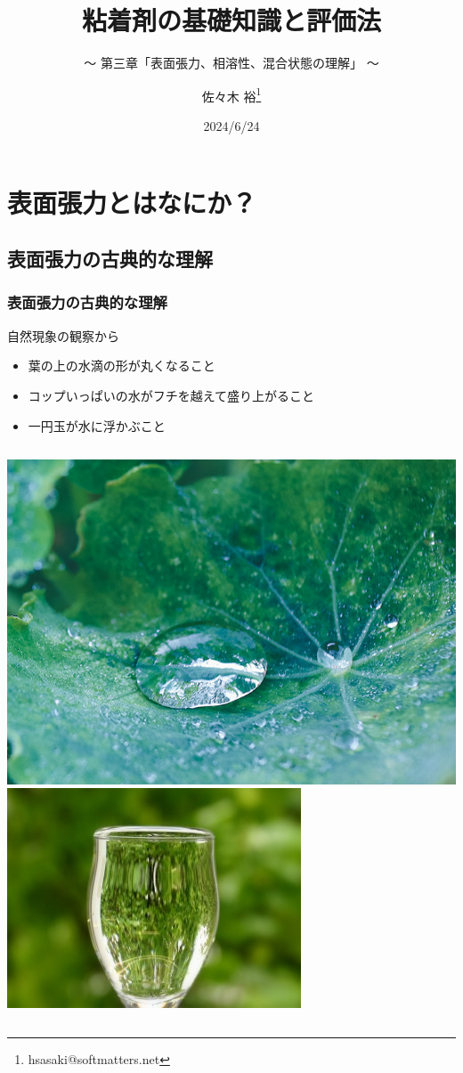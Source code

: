 \documentclass[unicode,12pt]{beamer}%
\title{粘着剤の基礎知識と評価法}
\subtitle{～ 第三章「表面張力、相溶性、混合状態の理解」 ～}
\author[SDL Inc. 佐々木]{佐々木 裕\thanks{hsasaki@softmatters.net}}
\institute[]{元 東亞合成株式会社\\ソフトマターデザインラボ合同会社}
\date{2024/6/24}
\begin{document}
\maketitle

\begin{frame} 
    \tableofcontents[]
\end{frame} 

\section{表面張力とはなにか？}

\subsection{表面張力の古典的な理解}
\begin{frame}
	\frametitle{表面張力の古典的な理解}
	\begin{block}{自然現象の観察から}
		\begin{itemize}
			\item 葉の上の水滴の形が丸くなること
			\item コップいっぱいの水がフチを越えて盛り上がること
			\item 一円玉が水に浮かぶこと
		\end{itemize}
		\begin{columns}[c, onlytextwidth]
			\centering
			\includegraphics[width=.6\textwidth]{waterdrop.png}
			\centering
			\includegraphics[width=.6\textwidth]{hyoumen_cup.jpg}

\end{columns}
\end{block}
\end{frame}
\end{document}
